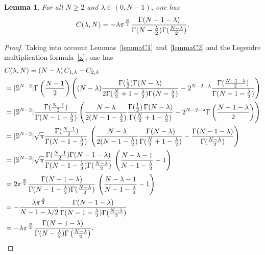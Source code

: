 \documentclass[10pt,reqno,english]{amsart}
\newtheorem{lemma}{Lemma}[section]
\theoremstyle{definition}
\numberwithin{equation}{section}
\begin{document}
\begin{lemma}
\label{lemmaC3}
For all $N\ge2$ and $\lambda\in(0,N-1)$, one has
\[
C (\lambda, N)=-\lambda\pi^{\frac N2}\frac{\Gamma(N-1-\lambda)}{ \Gamma (N -{\lambda \over 2})\Gamma(\frac{N-\lambda}{2})}.
 \]
\end{lemma}
\begin{proof}
Taking into account Lemmas~\ref{lemmaC1} and~\ref{lemmaC2} and the Legendre multiplication formula~\eqref{x}, one has
\begin{align*}
     &C (\lambda, N)= (N-\lambda ) \, C_{1,\lambda} - C_{2,\lambda } \\
    & = |\mathbb S^{N-2}| \Gamma \left({N-1 \over 2} \right)\left((N-\lambda){\Gamma ({1\over 2}) \Gamma (N-\lambda) \over 2 \Gamma ({N\over 2} + 1-{\lambda \over 2}) \Gamma (N-{\lambda \over 2}) }-2^{N-2 -\lambda } {\Gamma ({N-1 -\lambda \over 2}) \over \Gamma (N-1 -{\lambda \over 2})}\right)\\
    &= |\mathbb S^{N-2}|{ \Gamma ({N-1\over 2}) \over \Gamma (N-1 -{\lambda \over 2})} \left(  \frac{N-\lambda}{2(N-1 -{\lambda \over 2})}{\Gamma ( {1\over 2}) \,  \Gamma (N-\lambda) \over \Gamma ({N\over 2} + 1-{\lambda \over 2})  } -  2^{N-2 -\lambda }  \Gamma \left({N-1 -\lambda \over 2}\right)   \right) \\
    &=|\mathbb S^{N-2}|\sqrt\pi{ \, \Gamma ({N-1\over 2}) \over \Gamma (N-1 -{\lambda \over 2})} \, \left( \frac{N-\lambda}{2(N-1 -{\lambda \over 2})}{\Gamma (N-\lambda) \over \Gamma ({N\over 2} + 1-{\lambda \over 2})  }-\frac{\Gamma(N-1-\lambda)}{\Gamma(\frac{N-\lambda}{2})}\right)\\
   & =|\mathbb S^{N-2}|\sqrt\pi\frac{\Gamma ({N-1\over 2})\Gamma(N-1-\lambda)}{ \Gamma (N-1 -{\lambda \over 2})\Gamma(\frac{N-\lambda}{2})} \, \left(\frac{N-\lambda-1}{N-1 -{\lambda \over 2}}-1\right)\\
   &=2\pi^{\frac N2}\frac{\Gamma(N-1-\lambda)}{ \Gamma (N-1 -{\lambda \over 2})\Gamma(\frac{N-\lambda}{2})} \, \left(\frac{N-\lambda-1}{N-1 -{\lambda \over 2}}-1\right)\\
   &=-\frac{\lambda\pi^{\frac N2}}{N-1-\lambda/2}\frac{\Gamma(N-1-\lambda)}{ \Gamma (N-1 -{\lambda \over 2})\Gamma(\frac{N-\lambda}{2})}\\
   &=-\lambda\pi^{\frac N2}\frac{\Gamma(N-1-\lambda)}{ \Gamma (N -{\lambda \over 2})\Gamma\left(\frac{N-\lambda}{2}\right)}.\qedhere
\end{align*}
\end{proof}





\end{document}
